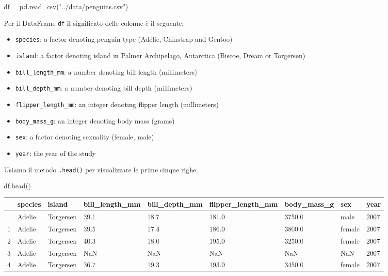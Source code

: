 \documentclass[
  letterpaper,
  krantz2]{{[}./krantz{]}}
\newenvironment{Shaded}{\begin{snugshade}}{\end{snugshade}}
\newcommand{\NormalTok}[1]{\textcolor[rgb]{0.00,0.23,0.31}{#1}}
\newcommand{\OperatorTok}[1]{\textcolor[rgb]{0.37,0.37,0.37}{#1}}
\newcommand{\StringTok}[1]{\textcolor[rgb]{0.13,0.47,0.30}{#1}}
\providecommand{\tightlist}{%
  \setlength{\itemsep}{0pt}\setlength{\parskip}{0pt}}\usepackage{longtable,booktabs,array}
\begin{document}
\begin{Shaded}
\begin{Highlighting}[]
\NormalTok{df }\OperatorTok{=}\NormalTok{ pd.read\_csv(}\StringTok{"../data/penguins.csv"}\NormalTok{)}
\end{Highlighting}
\end{Shaded}

Per il DataFrame \texttt{df} il significato delle colonne è il seguente:

\begin{itemize}
\tightlist
\item
  \texttt{species}: a factor denoting penguin type (Adélie, Chinstrap
  and Gentoo)
\item
  \texttt{island}: a factor denoting island in Palmer Archipelago,
  Antarctica (Biscoe, Dream or Torgersen)
\item
  \texttt{bill\_length\_mm}: a number denoting bill length (millimeters)
\item
  \texttt{bill\_depth\_mm}: a number denoting bill depth (millimeters)
\item
  \texttt{flipper\_length\_mm}: an integer denoting flipper length
  (millimeters)
\item
  \texttt{body\_mass\_g}: an integer denoting body mass (grams)
\item
  \texttt{sex}: a factor denoting sexuality (female, male)
\item
  \texttt{year}: the year of the study
\end{itemize}

Usiamo il metodo \texttt{.head()} per visualizzare le prime cinque
righe.

\begin{Shaded}
\begin{Highlighting}[]
\NormalTok{df.head()}
\end{Highlighting}
\end{Shaded}

\begin{longtable}[]{@{}lllllllll@{}}
\toprule\noalign{}
& species & island & bill\_length\_mm & bill\_depth\_mm &
flipper\_length\_mm & body\_mass\_g & sex & year \\
\midrule\noalign{}
\endhead
\bottomrule\noalign{}
\endlastfoot
0 & Adelie & Torgersen & 39.1 & 18.7 & 181.0 & 3750.0 & male & 2007 \\
1 & Adelie & Torgersen & 39.5 & 17.4 & 186.0 & 3800.0 & female & 2007 \\
2 & Adelie & Torgersen & 40.3 & 18.0 & 195.0 & 3250.0 & female & 2007 \\
3 & Adelie & Torgersen & NaN & NaN & NaN & NaN & NaN & 2007 \\
4 & Adelie & Torgersen & 36.7 & 19.3 & 193.0 & 3450.0 & female & 2007 \\
\end{longtable}
\end{document}
